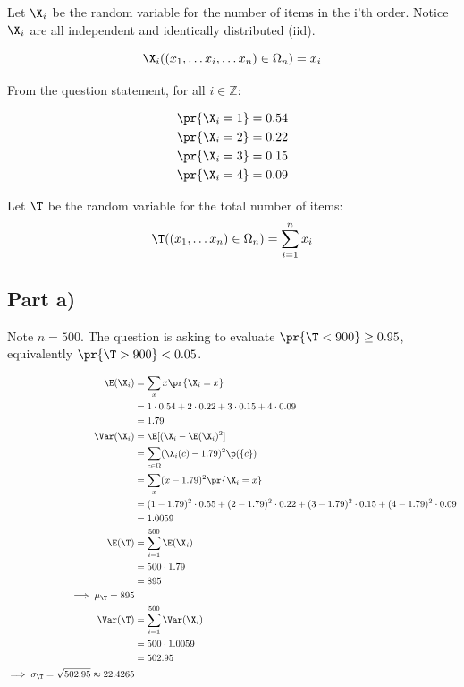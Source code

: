 Let $\X_i$ be the random variable for the number of items in the i'th order.
Notice $\X_i$ are all independent and identically distributed (iid).

\[
\X_i((x_1, \ldots x_i, \ldots x_n) \in \Omega_n) = x_i
\]

From the question statement, for all $i \in \mathbb{Z}$:

\begin{align*}
\pr{\X_i = 1} &= 0.54 \\
\pr{\X_i = 2} &= 0.22 \\
\pr{\X_i = 3} &= 0.15 \\
\pr{\X_i = 4} &= 0.09
\end{align*}

Let $\T$ be the random variable for the total number of items:
\[
\T((x_1, \ldots x_n) \in \Omega_n) = \sum _{i=1} ^n x_i
\]

\subsection{Part a)}

Note $n = 500$. The question is asking to evaluate $\pr{\T < 900} \geq 0.95$, equivalently $\pr{\T > 900} < 0.05$.

\begin{align*}
\E(\X_i) &= \sum _x x \pr{\X_i = x} \\
&= 1 \cdot 0.54 + 2 \cdot 0.22 + 3 \cdot 0.15 + 4 \cdot 0.09 \\
&= 1.79 \\
\Var(\X_i) &= \E[(\X_i - \E(\X_i)^2] \\
&= \sum _{c\in \Omega} (\X_i(c) - 1.79)^2 \p(\{ c \}) \\
&= \sum _x (x - 1.79)^2 \pr{\X_i = x} \\
&= (1 - 1.79)^2\cdot 0.55 + (2 - 1.79)^2\cdot0.22  + (3 - 1.79)^2 \cdot 0.15 + (4 - 1.79)^2 \cdot 0.09 \\
&= 1.0059 \\
\E(\T) &= \sum _{i = 1} ^{500} \E(\X_i) \\
&= 500 \cdot 1.79 \\
&= 895 \\
\implies \mu_\T = 895 \\
\Var(\T) &= \sum_{i=1}^{500} \Var(\X_i) \\
&= 500 \cdot 1.0059 \\
&= 502.95 \\
\implies \sigma_\T = \sqrt{502.95} \approx 22.4265
\end{align*}

